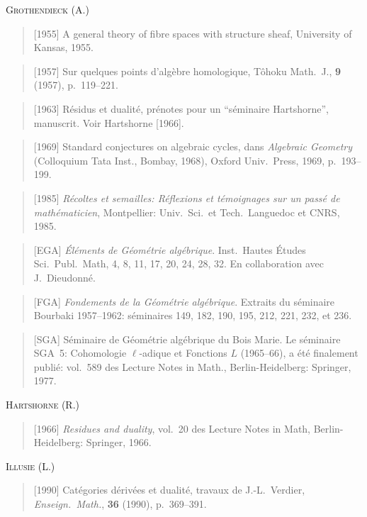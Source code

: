 \documentclass[11pt,a4paper]{article}
\theoremstyle{plain}
\theoremstyle{definition}
\begin{document}
\medskip
\noindent\textsc{Grothendieck (A.)}
\begin{quote}
[1955] A general theory of fibre spaces with structure sheaf, University of Kansas, 1955.
\end{quote}
\begin{quote}
[1957] Sur quelques points d'alg\`ebre homologique, T\^ohoku Math.\ J., \textbf{9} (1957), p.~119--221.
\end{quote}
\begin{quote}
[1963] R\'esidus et dualit\'e, pr\'enotes pour un ``s\'eminaire Hartshorne'', manuscrit. Voir Hartshorne [1966].
\end{quote}
\begin{quote}
[1969] Standard conjectures on algebraic cycles, dans \emph{Algebraic Geometry} (Colloquium Tata Inst., Bombay, 1968), Oxford Univ.\ Press, 1969, p.~193--199.
\end{quote}
\begin{quote}
[1985] \emph{R\'ecoltes et semailles: R\'eflexions et t\'emoignages sur un pass\'e de math\'ematicien}, Montpellier: Univ.\ Sci.\ et Tech.\ Languedoc et CNRS, 1985.
\end{quote}
\begin{quote}
[EGA] \emph{\'El\'ements de G\'eom\'etrie alg\'ebrique}. Inst.\ Hautes \'Etudes Sci.\ Publ.\ Math, 4, 8, 11, 17, 20, 24, 28, 32. En collaboration avec J.~Dieudonn\'e.
\end{quote}
\begin{quote}
[FGA] \emph{Fondements de la G\'eom\'etrie alg\'ebrique}. Extraits du s\'eminaire Bourbaki 1957--1962: s\'eminaires 149, 182, 190, 195, 212, 221, 232, et 236.
\end{quote}
\begin{quote}
[SGA] S\'eminaire de G\'eom\'etrie alg\'ebrique du Bois Marie. Le s\'eminaire SGA~5: Cohomologie $\ell$-adique et Fonctions $L$ (1965--66), a \'et\'e finalement publi\'e: vol.~589 des Lecture Notes in Math., Berlin-Heidelberg: Springer, 1977.
\end{quote}

\medskip
\noindent\textsc{Hartshorne (R.)}
\begin{quote}
[1966] \emph{Residues and duality}, vol.~20 des Lecture Notes in Math, Berlin-Heidelberg: Springer, 1966.
\end{quote}

\medskip
\noindent\textsc{Illusie (L.)}
\begin{quote}
[1990] Cat\'egories d\'eriv\'ees et dualit\'e, travaux de J.-L.~Verdier, \emph{Enseign.\ Math.}, \textbf{36} (1990), p.~369--391.
\end{quote}
\end{document}
